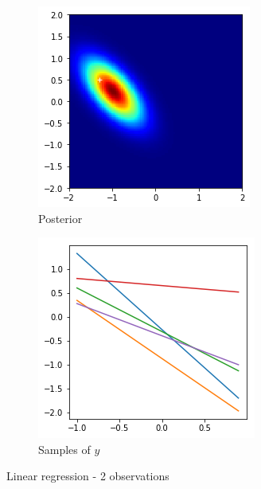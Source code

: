 \documentclass{article}
\begin{document}
\begin{figure}[H]
	\centering
	\begin{subfigure}[t]{0.3\linewidth}
		\includegraphics[width=\linewidth]{2-posterior}
		\caption{Posterior}
		\label{fig:2-p}
	\end{subfigure}
	\begin{subfigure}[t]{0.3\linewidth}
		\includegraphics[width=\linewidth]{2-samples}
		\caption{Samples of $y$}
		\label{fig:2-s}
	\end{subfigure}
	\caption{Linear regression - 2 observations}
	\label{fig:2-s}
\end{figure}
\end{document}
